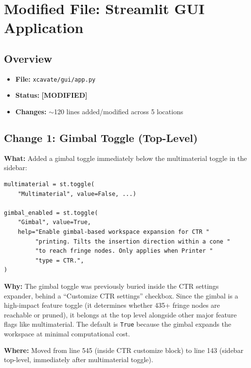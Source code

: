 \documentclass[11pt,a4paper]{article}
\newcommand{\filename}[1]{\texttt{\textcolor{accentblue}{#1}}}
\newcommand{\modlabel}{\textcolor{modifiedfile}{\textbf{[MODIFIED]}}}
\begin{document}
\section{Modified File: Streamlit GUI Application}
\label{sec:gui}

\subsection{Overview}

\begin{itemize}[nosep]
    \item \textbf{File:} \filename{xcavate/gui/app.py}
    \item \textbf{Status:} \modlabel
    \item \textbf{Changes:} $\sim$120 lines added/modified across 5 locations
\end{itemize}

\subsection{Change 1: Gimbal Toggle (Top-Level)}

\textbf{What:} Added a gimbal toggle immediately below the multimaterial toggle in the sidebar:

\begin{lstlisting}
multimaterial = st.toggle(
    "Multimaterial", value=False, ...)

gimbal_enabled = st.toggle(
    "Gimbal", value=True,
    help="Enable gimbal-based workspace expansion for CTR "
         "printing. Tilts the insertion direction within a cone "
         "to reach fringe nodes. Only applies when Printer "
         "type = CTR.",
)
\end{lstlisting}

\textbf{Why:} The gimbal toggle was previously buried inside the CTR settings expander, behind a ``Customize CTR settings'' checkbox. Since the gimbal is a high-impact feature toggle (it determines whether 435+ fringe nodes are reachable or pruned), it belongs at the top level alongside other major feature flags like multimaterial. The default is \texttt{True} because the gimbal expands the workspace at minimal computational cost.

\textbf{Where:} Moved from line 545 (inside CTR customize block) to line 143 (sidebar top-level, immediately after multimaterial toggle).
\end{document}
